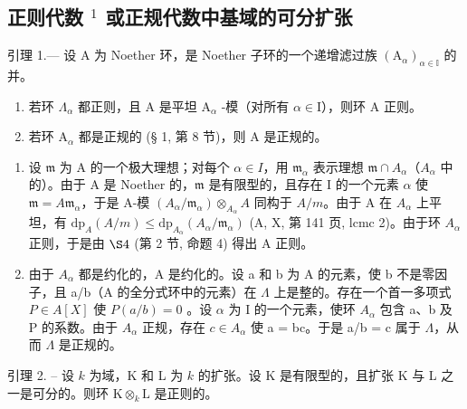 \subsection{\texorpdfstring{正则代数 \(^{1}\) 或正规代数中基域的可分扩张}{正则代数或正规代数中基域的可分扩张（1）}}

引理 1.--- 设 A 为 Noether 环，是 Noether 子环的一个递增滤过族 \((\mathrm{A}_{\alpha})_{\alpha\in\mathbb{I}}\) 的并。

\begin{enumerate}
\def\labelenumi{\alph{enumi})}
\item
  若环 \(\Lambda_{\alpha}\) 都正则，且 A 是平坦 \(\mathrm{A}_{\alpha}\) -模（对所有 \(\alpha \in \mathrm{I}\)），则环 A 正则。
\item
  若环 \(\mathrm{A}_{\alpha}\) 都是正规的 (§ 1, 第 8 节)，则 A 是正规的。
\end{enumerate}

\begin{enumerate}
\def\labelenumi{\alph{enumi})}
\item
  设 \(\mathfrak{m}\) 为 A 的一个极大理想；对每个 \(\alpha \in I\)，用 \(\mathfrak{m}_{\alpha}\) 表示理想 \(\mathfrak{m} \cap A_{\alpha}\)（\(A_{\alpha}\) 中的）。由于 A 是 Noether 的，\(\mathfrak{m}\) 是有限型的，且存在 I 的一个元素 \(\alpha\) 使 \(\mathfrak{m} = A\mathfrak{m}_{\alpha}\)，于是 A-模 \((A_{\alpha}/\mathfrak{m}_{\alpha}) \otimes_{A_{\alpha}} A\) 同构于 \(A/m\)。由于 A 在 \(A_{\alpha}\) 上平坦，有 \(\mathrm{dp}_{A}(A/m) \leqslant \mathrm{dp}_{A_{\alpha}}(A_{\alpha}/\mathfrak{m}_{\alpha})\) (A, X, 第 141 页, lcmc 2)。由于环 \(A_{\alpha}\) 正则，于是由 \(\S 4\) (第 2 节, 命题 4) 得出 A 正则。
\item
  由于 \(A_{\alpha}\) 都是约化的，A 是约化的。设 a 和 b 为 A 的元素，使 b 不是零因子，且 a/b（A 的全分式环中的元素）在 \(\Lambda\) 上是整的。存在一个首一多项式 \(P \in A[X]\) 使 \(P(a/b) = 0\) 。设 \(\alpha\) 为 I 的一个元素，使环 \(A_{\alpha}\) 包含 a、b 及 P 的系数。由于 \(A_{\alpha}\) 正规，存在 \(c \in A_{\alpha}\) 使 a = bc。于是 a/b = c 属于 \(\Lambda\)，从而 \(\Lambda\) 是正规的。
\end{enumerate}

引理 2. -- 设 \(k\) 为域，K 和 L 为 \(k\) 的扩张。设 K 是有限型的，且扩张 K 与 L 之一是可分的。则环 \(\mathrm{K} \otimes_{k} \mathrm{L}\) 是正则的。


